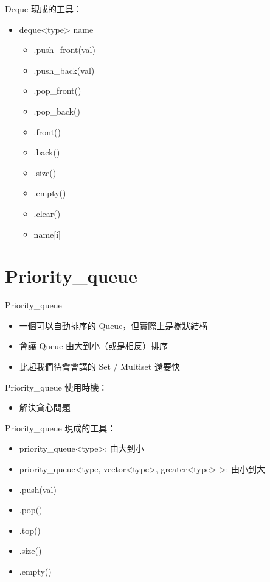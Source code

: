 \documentclass[mathserif]{beamer}
\begin{document}
\begin{frame}{Deque}
    現成的工具：
    \begin{itemize}
        \item deque<{\color{red}type}> {\color{red}name}
        \begin{itemize}
            \item .push\_front({\color{red}val})
            \item .push\_back({\color{red}val})
            \item .pop\_front()
            \item .pop\_back()
            \item .front()
            \item .back()
            \item .size()
            \item .empty()
            \item .clear()
            \item {\color{red}name}[{\color{red}i}]
        \end{itemize}
    \end{itemize}
\end{frame}

\section{Priority\_queue}

\begin{frame}{Priority\_queue}
    \begin{itemize}
        \item 一個可以自動排序的 Queue，但實際上是樹狀結構
        \item 會讓 Queue 由大到小（或是相反）排序
        \item 比起我們待會會講的 Set / Multiset 還要快
    \end{itemize}
\end{frame}

\begin{frame}{Priority\_queue}
    使用時機：
    \begin{itemize}
        \item 解決貪心問題
    \end{itemize}
\end{frame}

\begin{frame}{Priority\_queue}
    現成的工具：
    \begin{itemize}
        \item priority\_queue<{\color{red}type}>: 由大到小
        \item priority\_queue<{\color{red}type}, vector<{\color{red}type}>, greater<{\color{red}type}> >: 由小到大
        \item .push({\color{red}val})
        \item .pop()
        \item .top()
        \item .size()
        \item .empty()
    \end{itemize}
\end{frame}
\end{document}
